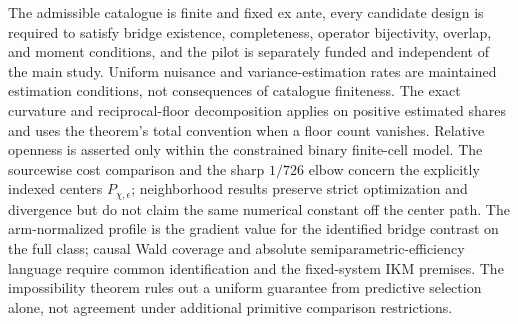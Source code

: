 The admissible catalogue is finite and fixed ex ante, every candidate design is required to satisfy bridge existence, completeness, operator bijectivity, overlap, and moment conditions, and the pilot is separately funded and independent of the main study. Uniform nuisance and variance-estimation rates are maintained estimation conditions, not consequences of catalogue finiteness. The exact curvature and reciprocal-floor decomposition applies on positive estimated shares and uses the theorem's total convention when a floor count vanishes. Relative openness is asserted only within the constrained binary finite-cell model. The sourcewise cost comparison and the sharp \(1/726\) elbow concern the explicitly indexed centers \(P_{\chi,\epsilon}\); neighborhood results preserve strict optimization and divergence but do not claim the same numerical constant off the center path. The arm-normalized profile is the gradient value for the identified bridge contrast on the full class; causal Wald coverage and absolute semiparametric-efficiency language require common identification and the fixed-system IKM premises. The impossibility theorem rules out a uniform guarantee from predictive selection alone, not agreement under additional primitive comparison restrictions.
